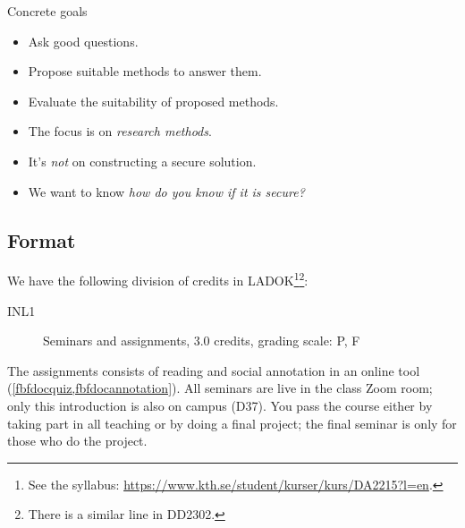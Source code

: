 \begin{frame}
  \begin{block}{Concrete goals}
    \begin{itemize}
      \item Ask good questions.
      \item Propose suitable methods to answer them.
      \item Evaluate the suitability of proposed methods.
    \end{itemize}
  \end{block}

  \begin{remark}
    \begin{itemize}
      \item The focus is on \emph{research methods}.
      \item It's \emph{not} on {constructing a secure solution}.
      \item We want to know \emph{how do you know if it is secure?}
    \end{itemize}
  \end{remark}
\end{frame}


\subsection{Format}

We have the following division of credits in LADOK\footnote{%
  See the syllabus:
  \url{https://www.kth.se/student/kurser/kurs/DA2215?l=en}.
}\footnote{%
  There is a similar line in DD2302.
}:
\begin{description}
  \item[INL1] Seminars and assignments, 3.0 credits, grading scale: P, F
\end{description}

The assignments consists of reading and social annotation in an online tool 
(\cref{fbfdocquiz,fbfdocannotation}).
All seminars are live in the class Zoom room; only this introduction is also
on campus (D37).
You pass the course either by taking part in all teaching or by doing a final
project; the final seminar is only for those who do the project.


